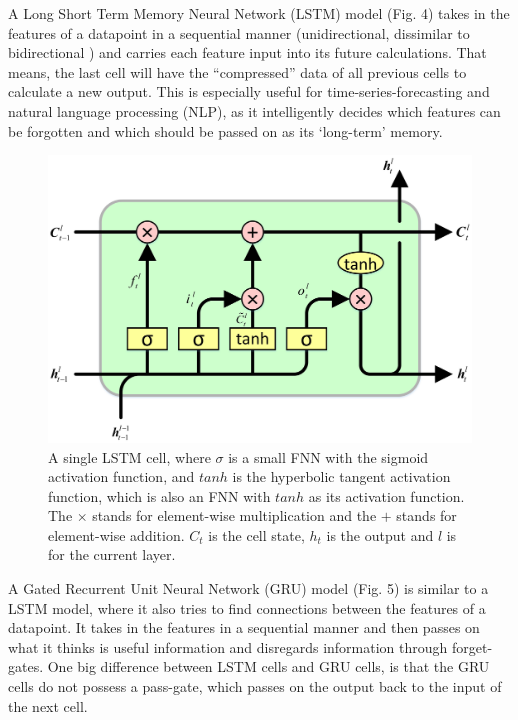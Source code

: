 \documentclass[conference]{IEEEtran}
\begin{document}
A Long Short Term Memory Neural Network (LSTM)\cite{Hochreiter} model (Fig. 4) takes in the features of a datapoint in a sequential manner (unidirectional, dissimilar to bidirectional \cite{Cui}) and carries each feature input into its future calculations. That means, the last cell will have the “compressed” data of all previous cells to calculate a new output. This is especially useful for time-series-forecasting\cite{Elsworth} and natural language processing (NLP)\cite{Schank}, as it intelligently decides which features can be forgotten and which should be passed on as its ‘long-term’ memory\cite{Sherstinsky}.


\begin{figure}[htbp]
\centerline{\includegraphics[scale=0.0185]{LSTM}}
\caption{A single LSTM cell, where $\sigma$ is a small FNN with the sigmoid activation function\cite{Nwankpa}, and $tanh$ is the hyperbolic tangent activation function\cite{Nwankpa}, which is also an FNN 
with $tanh$ as its activation function. The $\times$ stands for element-wise multiplication and the $+$ stands for element-wise addition. $C_t$ is the cell state, $h_t$ is the output and $l$ is for the current layer.}
\label{fig}
\end{figure}

\newpage

A Gated Recurrent Unit Neural Network (GRU)\cite{Cho} model (Fig. 5) is similar to a LSTM model, where it also tries to find connections between the features of a datapoint. It takes in the features in a sequential manner and then passes on what it thinks is useful information and disregards information through forget-gates. One big difference between LSTM cells and GRU cells, is that the GRU cells do not possess a pass-gate, which passes on the output back to the input of the next cell.
\end{document}
